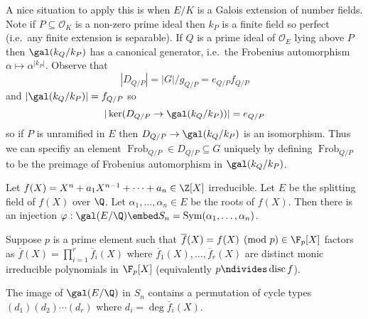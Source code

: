 \documentclass[a4paper]{article}
\renewcommand*{\O}{\mathcal{O}}
\DeclareMathOperator{\Frob}{Frob} %
\begin{document}
A nice situation to apply this is when \(E/K\) is a Galois extension of number fields. Note if \(P \subseteq \O_K\) is a non-zero prime ideal then \(k_P\) is a finite field so perfect (i.e.\ any finite extension is separable). If \(Q\) is a prime ideal of \(\O_E\) lying above \(P\) then \(\gal(k_Q/k_P)\) has a canonical generator, i.e.\ the Frobenius automorphism \(\alpha \mapsto \alpha^{|k_P|}\). Observe that
\[
  |D_{Q/P}| = |G|/g_{Q/P} = e_{Q/P} f_{Q/P}
\]
and \(|\gal(k_Q/k_P)| = f_{Q/P}\) so
\[
  |\ker (D_{Q/P} \to \gal(k_Q/k_P))| = e_{Q/P}
\]
so if \(P\) is unramified in \(E\) then \(D_{Q/P} \to \gal(k_Q/k_P)\) is an isomorphism. Thus we can specifiy an element \(\Frob_{Q/P} \in D_{Q/P} \subseteq G\) uniquely by defining \(\Frob_{Q/P}\) to be the preimage of Frobenius automorphism in \(\gal(k_Q/k_P)\).

\begin{eg}
  Let \(f(X) = X^n + a_1X^{n - 1} + \dots + a_n \in \Z[X]\) irreducible. Let \(E\) be the splitting field of \(f(X)\) over \(\Q\). Let \(\alpha_1, \dots, \alpha_n \in E\) be the roots of \(f(X)\). Then there is an injection \(\varphi: \gal(E/\Q) \embed S_n = \operatorname{Sym}(\alpha_1, \dots, \alpha_n)\).

  Suppose \(p\) is a prime element such that \(\overline f(X) = f(X) \pmod p \in \F_p[X]\) factors as \(\overline f(X) = \prod_{i = 1}^r \overline f_i(X)\) where \(\overline f_1(X), \dots, \overline f_r(X)\) are distinct monic irreducible polynomials in \(\F_p[X]\) (equivalently \(p \ndivides \operatorname{disc} f\)).
\end{eg}

\begin{proposition}
  The image of \(\gal(E/\Q)\) in \(S_n\) contains a permutation of cycle types \((d_1) (d_2) \cdots (d_r)\) where \(d_i = \deg \overline f_i(X)\).
\end{proposition}
\end{document}
